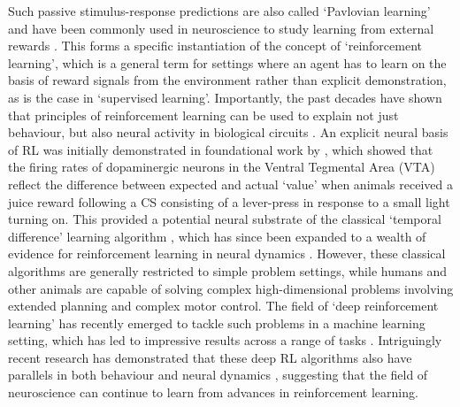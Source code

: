 Such passive stimulus-response predictions are also called `Pavlovian learning' and have been commonly used in neuroscience to study learning from external rewards \citep{niv2009reinforcement}.
This forms a specific instantiation of the concept of `reinforcement learning', which is a general term for settings where an agent has to learn on the basis of reward signals from the environment rather than explicit demonstration, as is the case in `supervised learning'.
Importantly, the past decades have shown that principles of reinforcement learning can be used to explain not just behaviour, but also neural activity in biological circuits \citep{niv2009reinforcement,botvinick2020deep}.
An explicit neural basis of RL was initially demonstrated in foundational work by \citet{schultz1997neural}, which showed that the firing rates of dopaminergic neurons in the Ventral Tegmental Area (VTA) reflect the difference between expected and actual `value' when animals received a juice reward following a CS consisting of a lever-press in response to a small light turning on.
This provided a potential neural substrate of the classical `temporal difference' learning algorithm \citep{schultz1997neural}, which has since been expanded to a wealth of evidence for reinforcement learning in neural dynamics \citep{niv2009reinforcement, dabney2020distributional}.
However, these classical algorithms are generally restricted to simple problem settings, while humans and other animals are capable of solving complex high-dimensional problems involving extended planning and complex motor control.
The field of `deep reinforcement learning' has recently emerged to tackle such problems in a machine learning setting, which has led to impressive results across a range of tasks \citep{mnih2013playing, schrittwieser2020mastering, wurman2022outracing, vinyals2019grandmaster}.
Intriguingly recent research has demonstrated that these deep RL algorithms also have parallels in both behaviour and neural dynamics \citep{botvinick2020deep, wang2018prefrontal, dabney2020distributional, jensen2023recurrent,aldarondo2024virtual}, suggesting that the field of neuroscience can continue to learn from advances in reinforcement learning.

